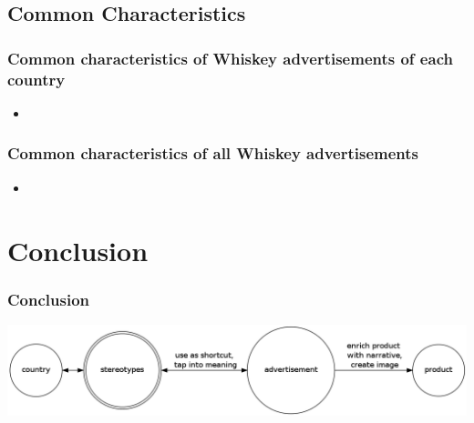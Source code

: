 \documentclass{beamer}
\begin{document}
\subsection{Common Characteristics}

\begin{frame}
 \frametitle{Common characteristics of Whiskey advertisements of each country}
 \begin{itemize}
  \item
 \end{itemize}
\end{frame}

\begin{frame}
 \frametitle{Common characteristics of all Whiskey advertisements}
 \begin{itemize}
  \item
 \end{itemize}
\end{frame}

\section{Conclusion}

\begin{frame}
 \frametitle{Conclusion}
 \includegraphics[scale=.25]{concepts.png}
\end{frame}

\end{document}
